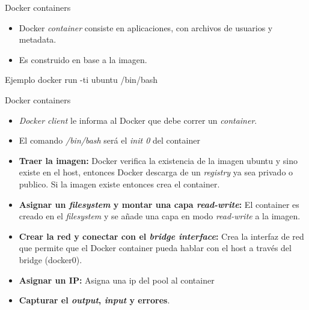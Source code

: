 \documentclass{bredelebeamer}
\begin{document}
\begin{frame}{Docker containers}
\begin{itemize}
	\item 	Docker \textit{container} consiste en aplicaciones, con archivos de usuarios y metadata.
	\item Es construido en base a la imagen.
\end{itemize}
\begin{block}{Ejemplo}
docker run -ti ubuntu /bin/bash
\end{block}

\end{frame}


\begin{frame}{Docker containers}
	\begin{itemize}
		\item \textit{Docker client} le informa al Docker que debe correr un \textit{container}.
		\item El comando \textit{/bin/bash} será el \textit{init 0} del container 
		\item \textbf{Traer la imagen:} Docker verifica la existencia de la imagen ubuntu y sino existe en el host, entonces Docker descarga de un \textit{registry} ya sea privado o publico. Si la imagen existe entonces crea el container.
		\item \textbf{Asignar un \textit{filesystem} y montar una capa \textit{read-write}:} El 
			container es creado en el \textit{filesystem} y se añade una capa en modo 
			\textit{read-write} a la imagen.
		\item \textbf{Crear la red y conectar con el \textit{bridge interface}:} Crea la interfaz de red que permite que el Docker container pueda hablar con el host a través del bridge (docker0).
		\item \textbf{Asignar un IP:} Asigna una ip del pool al container
		\item \textbf{Capturar el \textit{output}, \textit{input} y errores}.
	\end{itemize}
\end{frame}
\end{document}
